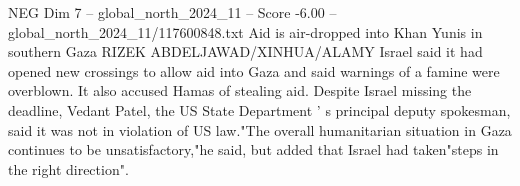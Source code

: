 \begin{textsample}{NEG Dim 7 – global\_north\_2024\_11 – Score -6.00 – global\_north\_2024\_11/117600848.txt}
Aid is air-dropped into Khan Yunis in southern Gaza RIZEK ABDELJAWAD/XINHUA/ALAMY Israel said it had opened new crossings to allow aid into Gaza and said warnings of a famine were overblown.
It also accused Hamas of stealing aid.
Despite Israel missing the deadline, Vedant Patel, the US State Department ' s principal deputy spokesman, said it was not in violation of US law."The overall humanitarian situation in Gaza continues to be unsatisfactory,"he said, but added that Israel had taken"steps in the right direction".

\end{textsample}
